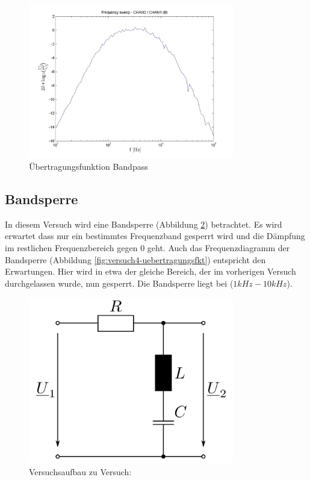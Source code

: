 \documentclass[a4paper]{article}
\begin{document}
\begin{figure}[H]
    \centering
    \includegraphics[width=0.8\textwidth]{versuch3/versuch3_uebertragungsfkt.jpg}
    \caption{Übertragungsfunktion Bandpass}
    \label{fig:versuch3-uebertragungsfkt}
\end{figure}

\subsection{Bandsperre}
\label{subsec:versuch4-bandsperre}
In diesem Versuch wird eine Bandsperre (Abbildung \ref{fig:versuch4-aufbau}) betrachtet. Es wird erwartet dass nur ein bestimmtes Frequenzband gesperrt wird und die Dämpfung im restlichen Frequenzbereich gegen 0 geht.
Auch das Frequenzdiagramm der Bandsperre (Abbildung \ref{fig:versuch4-uebertragungsfkt}) entspricht den Erwartungen. Hier wird in etwa der gleiche Bereich, der im vorherigen Versuch durchgelassen wurde, nun gesperrt. Die Bandsperre liegt bei ($1\si{kHz}-10\si{kHz}$).

\begin{figure}[H]
    \centering
    \includegraphics[width=0.8\textwidth]{versuch4/versuch4_aufbau.png}
    \caption{Versuchsaufbau zu Versuch: }
    \label{fig:versuch4-aufbau}
\end{figure}
\end{document}
